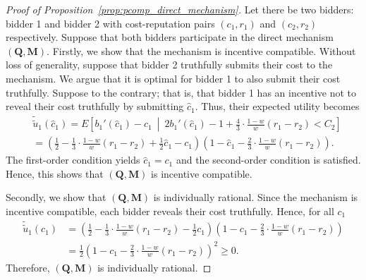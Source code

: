 \begin{proof}[Proof of Proposition~\ref{prop:pcomp_direct_mechanism}]
Let there be two bidders: bidder 1 and bidder 2 with cost-reputation pairs $(c_1,r_1)$ and $(c_2,r_2)$ respectively. Suppose that both bidders participate in the direct mechanism $(\mathbf{Q},\mathbf{M})$. Firstly, we show that the mechanism is incentive compatible. Without loss of generality, suppose that bidder 2 truthfully submits their cost to the mechanism. We argue that it is optimal for bidder 1 to also submit their cost truthfully. Suppose to the contrary; that is, that bidder 1 has an incentive not to reveal their cost truthfully by submitting $\hat{c}_1$. Thus, their expected utility becomes
\begin{align*}
	&\tilde{\tilde{u}}_1(\hat{c}_1) = E\left[ b_1'(\hat{c}_1) - c_1 \:\middle\vert\: 2b_1'(\hat{c}_1) - 1 + \frac{4}{3}\cdot\frac{1-w}{w}(r_1-r_2) < C_2 \right] \\
	&= \left(\frac{1}{2} - \frac{1}{3}\cdot\frac{1-w}{w}(r_1-r_2) + \frac{1}{2}\hat{c}_1 - c_1 \right)\left(1 - \hat{c}_1 - \frac{2}{3}\cdot\frac{1-w}{w}(r_1-r_2)\right).
\end{align*}
The first-order condition yields $\hat{c}_1 = c_1$ and the second-order condition is satisfied. Hence, this shows that $(\mathbf{Q},\mathbf{M})$ is incentive compatible.

Secondly, we show that $(\mathbf{Q},\mathbf{M})$ is individually rational. Since the mechanism is incentive compatible, each bidder reveals their cost truthfully. Hence, for all $c_1$
\begin{align*}
	\tilde{\tilde{u}}_1(c_1) &= \left(\frac{1}{2} - \frac{1}{3}\cdot\frac{1-w}{w}(r_1-r_2) - \frac{1}{2}c_1 \right)\left(1 - c_1 - \frac{2}{3}\cdot\frac{1-w}{w}(r_1-r_2)\right)\\
	&= \frac{1}{2}\left( 1 - c_1 - \frac{2}{3}\cdot\frac{1-w}{w}(r_1-r_2) \right)^2 \ge 0.
\end{align*}
Therefore, $(\mathbf{Q},\mathbf{M})$ is individually rational.
\end{proof}

